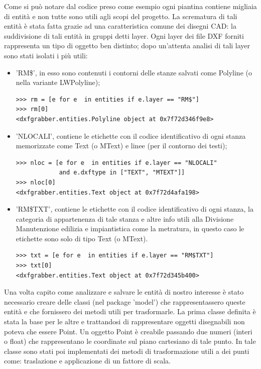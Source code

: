 \documentclass[12pt]{report}
\begin{document}
Come si può notare dal codice preso come esempio ogni piantina contiene migliaia di entità e non tutte sono utili agli scopi del progetto. La scrematura di tali entità è stata fatta grazie ad una caratteristica comune dei disegni CAD: la suddivisione di tali entità in gruppi detti layer. Ogni layer dei file DXF forniti rappresenta un tipo di oggetto ben distinto; dopo un'attenta analisi di tali layer sono stati isolati i più utili:
\begin{itemize}
\item 'RM\$', in esso sono contenuti i contorni delle stanze salvati come Polyline (o nella variante LWPolyline);
\begin{lstlisting}[label=codice,caption=Analisi del layer 'RM\$', frame=single]
>>> rm = [e for e  in entities if e.layer == "RM$"]
>>> rm[0]
<dxfgrabber.entities.Polyline object at 0x7f72d346f9e8>
\end{lstlisting}

\item 'NLOCALI', contiene le etichette con il codice identificativo di ogni stanza memorizzate come Text (o MText) e linee (per il contorno dei testi);
\begin{lstlisting}[label=codice,caption=Analisi del layer 'NLOCALI', frame=single]
>>> nloc = [e for e  in entities if e.layer == "NLOCALI" 
            and e.dxftype in ["TEXT", "MTEXT"]]
>>> nloc[0]
<dxfgrabber.entities.Text object at 0x7f72d4afa198>
\end{lstlisting}

\item 'RM\$TXT', contiene le etichette con il codice identificativo di ogni stanza, la categoria di appartenenza di tale stanza e altre info utili alla Divisione Manutenzione edilizia e impiantistica come la metratura, in questo caso le etichette sono solo di tipo Text (o MText).
\begin{lstlisting}[label=codice,caption=Analisi del layer 'RM\$TXT', frame=single]
>>> txt = [e for e  in entities if e.layer == "RM$TXT"]
>>> txt[0]
<dxfgrabber.entities.Text object at 0x7f72d345b400>
\end{lstlisting}

\end{itemize}

Una volta capito come analizzare e salvare le entità di nostro interesse è stato necessario creare delle classi (nel package 'model') che rappresentassero queste entità e che fornissero dei metodi utili per trasformarle. 
La prima classe definita è stata la base per le altre e trattandosi di rappresentare oggetti disegnabili non poteva che essere Point. 
Un oggetto Point è creabile passando due numeri (interi o float) che rappresentano le coordinate sul piano cartesiano di tale punto. 
In tale classe sono stati poi implementati dei metodi di trasformazione utili a dei punti come: traslazione e applicazione di un fattore di scala.
\end{document}
